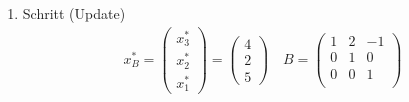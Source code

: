 \documentclass[a4paper]{scrartcl}
\begin{document}
\begin{enumerate}[label=\bfseries\arabic*.]
\begin{enumerate}
\begin{enumerate}[1.]
\begin{enumerate}[1.]
                            \item Schritt (Update)
                                \begin{gather}
                                    x_B^* =
                                    \begin{pmatrix}
                                        x_3^* \\ x_2^* \\ x_1^*
                                    \end{pmatrix}
                                    =
                                    \begin{pmatrix}
                                        4 \\ 2 \\ 5
                                    \end{pmatrix}
                                    \quad
                                    B =
                                    \begin{pmatrix}
                                        1 & 2 & -1 \\
                                        0 & 1 & 0 \\
                                        0 & 0 & 1 \\
                                    \end{pmatrix}
                                \end{gather}

                        \end{enumerate}


\end{enumerate}
\end{enumerate}
\end{enumerate}
\end{document}
